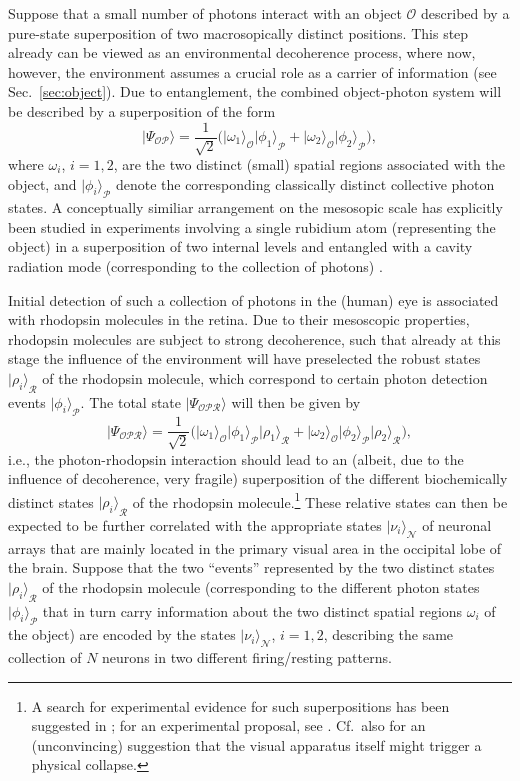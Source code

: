 \documentclass[twocolumn,aps,floatfix,amsmath,amssymb,showpacs,nofootinbib]{revtex4}
\newcommand{\be}{\begin{equation}} \newcommand{\ee}{\end{equation}}
\newcommand{\ket}[1]{\ensuremath{|{#1\rangle}}}
\begin{document}
Suppose that a small number of photons interact with an object
$\mathcal{O}$ described by a pure-state superposition of two
macrosopically distinct positions. This step already can be viewed as
an environmental decoherence process, where now, however, the
environment assumes a crucial role as a carrier of information (see
Sec.~\ref{sec:object}). Due to entanglement, the combined
object-photon system will be described by a superposition of the form
%
\be
\ket{\Psi_\mathcal{OP}} = \frac{1}{\sqrt{2}} \bigl(
\ket{\omega_1}_\mathcal{O} \ket{\phi_1}_\mathcal{P} +
\ket{\omega_2}_\mathcal{O} \ket{\phi_2}_\mathcal{P} \bigr),
\ee
%
where $\omega_i$, $i=1,2$, are the two distinct (small) spatial
regions associated with the object, and $\ket{\phi_i}_\mathcal{P}$
denote the corresponding classically distinct collective photon
states. A conceptually similiar arrangement on the mesosopic scale has
explicitly been studied in experiments involving a single rubidium
atom (representing the object) in a superposition of two internal
levels and entangled with a cavity radiation mode (corresponding to
the collection of photons) \cite{Brune:1996:om,Raimond:1997:um}.

Initial detection of such a collection of photons in the (human) eye
is associated with rhodopsin molecules in the retina.  Due to their
mesoscopic properties, rhodopsin molecules are subject to strong
decoherence, such that already at this stage the influence of the
environment will have preselected the robust states
$\ket{\rho_i}_\mathcal{R}$ of the rhodopsin molecule, which correspond
to certain photon detection events $\ket{\phi_i}_\mathcal{P}$.  The
total state $\ket{\Psi_\mathcal{OPR}}$ will then be given by
%
\be
\ket{\Psi_\mathcal{OPR}} = \frac{1}{\sqrt{2}} \bigl(
\ket{\omega_1}_\mathcal{O} \ket{\phi_1}_\mathcal{P}
\ket{\rho_1}_\mathcal{R} +
\ket{\omega_2}_\mathcal{O} \ket{\phi_2}_\mathcal{P}
\ket{\rho_2}_\mathcal{R} \bigr),
\ee
%
i.e., the photon-rhodopsin interaction should lead to an (albeit, due
to the influence of decoherence, very fragile) superposition of the
different biochemically distinct states $\ket{\rho_i}_\mathcal{R}$ of
the rhodopsin molecule.\footnote{A search for experimental evidence
  for such superpositions has been suggested in
  \cite{Shimony:1998:yy}; for an experimental proposal, see
  \cite{Hilaire:2002:ya}. Cf.\ also \cite{Thaheld:2005:om}
  for an (unconvincing) suggestion that the visual apparatus itself
  might trigger a physical collapse.} These relative states can then be
expected to be further correlated with the appropriate states
$\ket{\nu_i}_\mathcal{N}$ of neuronal arrays that are mainly located
in the primary visual area in the occipital lobe of the brain. Suppose
that the two ``events'' represented by the two distinct states
$\ket{\rho_i}_\mathcal{R}$ of the rhodopsin molecule (corresponding to
the different photon states $\ket{\phi_i}_\mathcal{P}$ that in turn
carry information about the two distinct spatial regions $\omega_i$ of
the object) are encoded by the states $\ket{\nu_i}_\mathcal{N}$,
$i=1,2$, describing the same collection of $N$ neurons in two
different firing/resting patterns.
\end{document}
